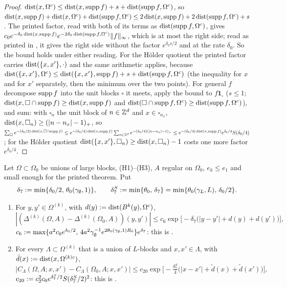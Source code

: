\begin{proof}
$\operatorname{dist}(x,\Omega^c)\le\operatorname{dist}(x,\operatorname{supp} f)+s+\operatorname{dist}(\operatorname{supp} f,\Omega^c)$, so $\operatorname{dist}(x,\operatorname{supp} f)+\operatorname{dist}(x,\Omega^c)+\operatorname{dist}(\operatorname{supp} f,\Omega^c)\le2\operatorname{dist}(x,\operatorname{supp} f)+2\operatorname{dist}(\operatorname{supp} f,\Omega^c)+s$. The printed factor, read with both of its terms as $\operatorname{dist}(\operatorname{supp} f,\Omega^c)$, gives $c_0e^{-\delta_0\operatorname{dist}(x,\operatorname{supp} f)}e^{-2\delta_0\operatorname{dist}(\operatorname{supp} f,\Omega^c)}\lVert f\rVert_\infty$, which is at most the right side; read as printed in \cite[(2.26)]{Ba1}, it gives the right side without the factor $e^{\delta_0s/2}$ and at the rate $\delta_0$. So the bound holds under either reading. For the H\"older quotient the printed factor carries $\operatorname{dist}(\{x,x'\},\cdot)$ and the same arithmetic applies, because $\operatorname{dist}(\{x,x'\},\Omega^c)\le\operatorname{dist}(\{x,x'\},\operatorname{supp} f)+s+\operatorname{dist}(\operatorname{supp} f,\Omega^c)$ (the inequality for $x$ and for $x'$ separately, then the minimum over the two points). For general $f$ decompose $\operatorname{supp} f$ into the unit blocks $\square$ it meets, apply the bound to $f\mathbf 1_\square$ ($s\le1$; $\operatorname{dist}(x,\square\cap\operatorname{supp} f)\ge\operatorname{dist}(x,\operatorname{supp} f)$ and $\operatorname{dist}(\square\cap\operatorname{supp} f,\Omega^c)\ge\operatorname{dist}(\operatorname{supp} f,\Omega^c)$), and sum: with $\square_n$ the unit block of $n\in\mathbb Z^d$ and $x\in\square_{n_x}$, $\operatorname{dist}(x,\square_n)\ge(|n-n_x|-1)_+$, so $\sum_\square e^{-(\delta_0/2)\operatorname{dist}(x,\square\cap\operatorname{supp} f)}\le e^{-(\delta_0/4)\operatorname{dist}(x,\operatorname{supp} f)}\sum_{n\in\mathbb Z^d}e^{-(\delta_0/4)(|n-n_x|-1)_+}\le e^{-(\delta_0/4)\operatorname{dist}(x,\operatorname{supp} f)}e^{\delta_0/4}S(\delta_0/4)$; for the H\"older quotient $\operatorname{dist}(\{x,x'\},\square_n)\ge\operatorname{dist}(x,\square_n)-1$ costs one more factor $e^{\delta_0/4}$.
\end{proof}

\begin{lemma}\label{lem:a06A:domdiff}
Let $\Omega\subset\Omega_0$ be unions of large blocks, (H1)--(H3), $A$ regular on $\Omega_0$, $e_k\le e_1$ and small enough for the printed theorem. Put
\[
\delta_7:=\min\{\delta_0/2,\,\theta_0(\gamma_\emptyset,1)\},\qquad\delta^S_7:=\min\{\theta_0,\,\delta_7\}=\min\{\theta_0(\gamma_L,L),\,\delta_0/2\}.
\]
\begin{enumerate}[label=\textup{(\alph*)},nosep,leftmargin=*]
\item For $y,y'\in\Omega^{(k)}$, with $d(y):=\operatorname{dist}(B^k(y),\Omega^c)$,
\[
|(\Delta^{(k)}(\Omega,A)-\Delta^{(k)}(\Omega_0,A))(y,y')|\le c_6\exp\big[-\delta_7\big(|y-y'|+d(y)+d(y')\big)\big],
\]
$c_6:=\max\{a^2c_0e^{\delta_0/2},\,4a^2\gamma_\emptyset^{-1}e^{2\theta_0(\gamma_\emptyset,1)R_0}\}e^{\delta_7}$: this is \cite[(5.5)]{Ba4}.
\item For every $\Lambda\subset\Omega^{(k)}$ that is a union of $L$-blocks and $x,x'\in\Lambda$, with $\tilde d(x):=\operatorname{dist}(x,\Omega^{(k)c})$,
\[
|C_\Lambda(\Omega,A;x,x')-C_\Lambda(\Omega_0,A;x,x')|\le c_{20}\exp\big[-\tfrac{\delta^S_7}4\big(|x-x'|+\tilde d(x)+\tilde d(x')\big)\big],
\]
$c_{20}:= c_2^2c_6e^{\delta^S_7/2}S(\delta^S_7/2)^2$: this is \cite[(1.20)]{Ba4}.
\end{enumerate}
\end{lemma}

